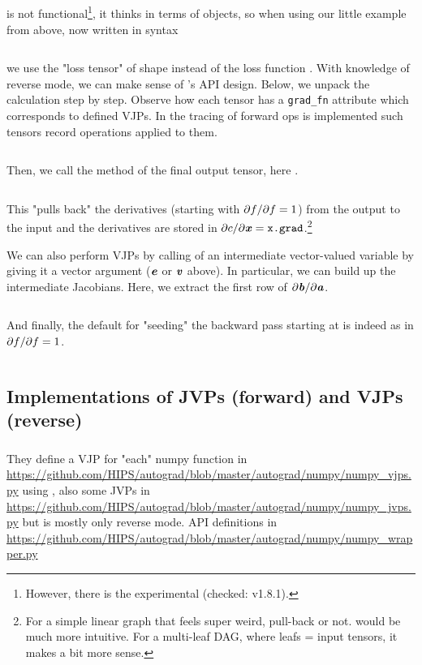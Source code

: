 \documentclass[paper=a4,11pt,headsepline]{scrartcl}
\newcommand{\ipmpy}[1]{\inputminted[xleftmargin=0.9cm]{python}{#1}}
\begin{document}
\subsection{\pytorch}
%
\pytorch is not functional\footnote{However, there is the experimental
 (checked: v1.8.1).}, it thinks in terms of
 objects, so when using our little example from above, now
written in \pytorch syntax
%
\ipmpy{../talk/code/pytorch_fwd_rev_1.py}
%
we use the "loss tensor"  of shape  instead of the loss function
. With knowledge of reverse mode, we can make sense of \pytorch's API
design. Below, we unpack the calculation step by step. Observe how each tensor
has a \verb|grad_fn| attribute which corresponds to defined VJPs. In \pytorch
the tracing of forward ops is implemented such tensors record
operations applied to them.
%
\ipmpy{../talk/code/pytorch_fwd_rev_2.py}
%
Then, we call the  method of the final output tensor, here
.
%
\ipmpy{../talk/code/pytorch_fwd_rev_3.py}
%
This "pulls back" the derivatives (starting with $\partial f/\partial f=1$) from the
output  to the input and the derivatives are stored in $\partial c/\partial \bm{\mathit{x}} =
\texttt{x.grad}$.\footnote{For a simple linear graph that feels super weird,
pull-back or not.  would be much more intuitive. For a multi-leaf
DAG, where leafs = input tensors, it makes a bit more sense.}

We can also perform VJPs by calling  of an intermediate
vector-valued variable by giving it a vector argument ($\bm{\mathit{e}}$ or $\bm{\mathit{v}}$ above). In particular, we can build up the intermediate
Jacobians. Here, we extract the first row of $\partial \bm{\mathit{b}}/\partial \bm{\mathit{a}}$.
%
\ipmpy{../talk/code/pytorch_rev_detail_2.py}
%
And finally, the default for "seeding" the backward pass starting at 
is indeed  as in $\partial f/\partial f=1$.
%
\ipmpy{../talk/code/pytorch_rev_detail_1.py}

\subsection{Implementations of JVPs (forward) and VJPs (reverse)}

\subsubsection{\autograd}

They define a VJP for "each" numpy function in
\url{https://github.com/HIPS/autograd/blob/master/autograd/numpy/numpy_vjps.py}
using , also some JVPs in
\url{https://github.com/HIPS/autograd/blob/master/autograd/numpy/numpy_jvps.py}
but \autograd is mostly only reverse mode. \numpy API definitions in
\url{https://github.com/HIPS/autograd/blob/master/autograd/numpy/numpy_wrapper.py}
\end{document}
